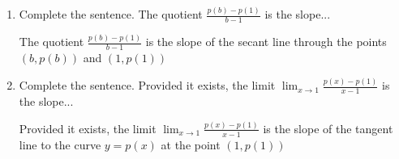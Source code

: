 \documentclass[nooutcomes,handout]{ximera}
\begin{document}
\begin{problem}
\begin{enumerate}
\begin{freeResponse}
		\end{freeResponse}

		\item Complete the sentence.  The quotient $\frac{p(b)-p(1)}{b-1}$ is the slope...

		\begin{freeResponse}
			The quotient $\frac{p(b)-p(1)}{b-1}$ is the slope of the secant line through the points $(b,p(b))$ and $(1,p(1))$
		\end{freeResponse}

		\item Complete the sentence.  Provided it exists, the limit $\lim_{x \to 1}\frac{p(x)-p(1)}{x-1}$ is the slope...
		\begin{freeResponse}
			 Provided it exists, the limit $\lim_{x \to 1}\frac{p(x)-p(1)}{x-1}$ is the slope of the tangent line to the curve $y=p(x)$ at the point $(1,p(1))$
		\end{freeResponse}
	\end{enumerate}
\end{problem}
\end{document}
